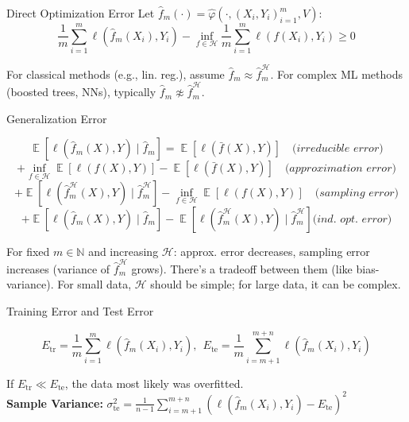 \documentclass[a4paper,10pt]{article}
\DeclareMathOperator{\E}{\mathbb{E}}
\begin{document}
\begin{small}
\begin{subbox}{Direct Optimization Error}
Let $\hat{f}_m(\cdot) = \hat{\varphi}(\cdot, (X_i, Y_i)_{i=1}^{m}, V)
$:
    $$\frac{1}{m} \sum_{i=1}^{m} \ell \left( \hat{f}_m(X_i), Y_i \right) 
- \inf_{f \in \mathcal{H}} \frac{1}{m} \sum_{i=1}^{m} \ell \left( f(X_i), Y_i \right) \geq 0
$$
\end{subbox}
For classical methods (e.g., lin. reg.), assume \(\hat{f}_m \approx \hat{f}_m^{\mathcal{H}}\). For complex ML methods (boosted trees, NNs), typically \(\hat{f}_m \not\approx \hat{f}_m^{\mathcal{H}}\).

\begin{subbox}{Generalization Error}
\begin{footnotesize}
\[
\E\left[\ell(\hat{f}_m(X), Y) \mid \hat{f}_m\right]
= \E[\ell(\bar{f}(X), Y)] \quad \textit{(irreducible error)}
\]
\[
+ \inf_{f \in \mathcal{H}} \E[\ell(f(X), Y)] - \E[\ell(\bar{f}(X), Y)] \quad \textit{(approximation error)}
\]
\[
+ \E \left[\ell\left(\hat{f}_m^{\mathcal{H}}(X), Y\right) \mid \hat{f}_m^{\mathcal{H}}\right] - \inf_{f \in \mathcal{H}} \E[\ell(f(X), Y)] \quad \textit{(sampling error)}
\]
\[
+ \E \left[\ell\left(\hat{f}_m(X), Y\right) \mid \hat{f}_m\right] - \E \left[\ell\left(\hat{f}_m^{\mathcal{H}}(X), Y\right) \mid \hat{f}_m^{\mathcal{H}}\right] \textit{(ind. opt. error)}
\]
\end{footnotesize}
\end{subbox}
For fixed \(m \in \mathbb{N}\) and increasing \(\mathcal{H}\): approx. error decreases, sampling error increases (variance of \(\hat{f}_m^{\mathcal{H}}\) grows). There's a tradeoff between them (like bias-variance). For small data, \(\mathcal{H}\) should be simple; for large data, it can be complex.

\begin{subbox}{ Training Error and Test Error}
\begin{footnotesize}
$$E_{\text{tr}} = \frac{1}{m} \sum_{i=1}^{m} \ell\left(\hat{f}_m(X_i), Y_i\right), \ \ E_{\text{te}} = \frac{1}{m} \sum_{i=m+1}^{m+n} \ell\left(\hat{f}_m(X_i), Y_i\right)$$
\end{footnotesize}
\end{subbox}

If $E_{\text{tr}} \ll E_{\text{te}}$, the data most likely was overfitted. \\
\textbf{Sample Variance:} $\sigma_{\text{te}}^2 = \frac{1}{n-1} \sum_{i=m+1}^{m+n} \left( \ell\left(\hat{f}_m(X_i), Y_i\right) - E_{\text{te}} \right)^2$


\end{small}
\end{document}
